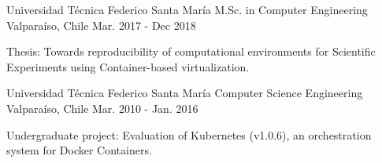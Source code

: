 \begin{cventries}
  \cventry
    {Universidad Técnica Federico Santa María}
        {M.Sc. in Computer Engineering}
    {Valparaíso, Chile}
    {Mar. 2017 - Dec 2018}
    {
      \begin{cvitems}
        \item{Thesis: Towards reproducibility of computational environments for Scientific Experiments using Container-based virtualization.}
      \end{cvitems}
    }

  \cventry
      {Universidad Técnica Federico Santa María}
    {Computer Science Engineering}
    {Valparaíso, Chile}
    {Mar. 2010 - Jan. 2016}
    {
      \begin{cvitems}
        \item {Undergraduate project: Evaluation of Kubernetes (v1.0.6), an orchestration system for Docker Containers.}
        \end{cvitems}
    }
\end{cventries}
